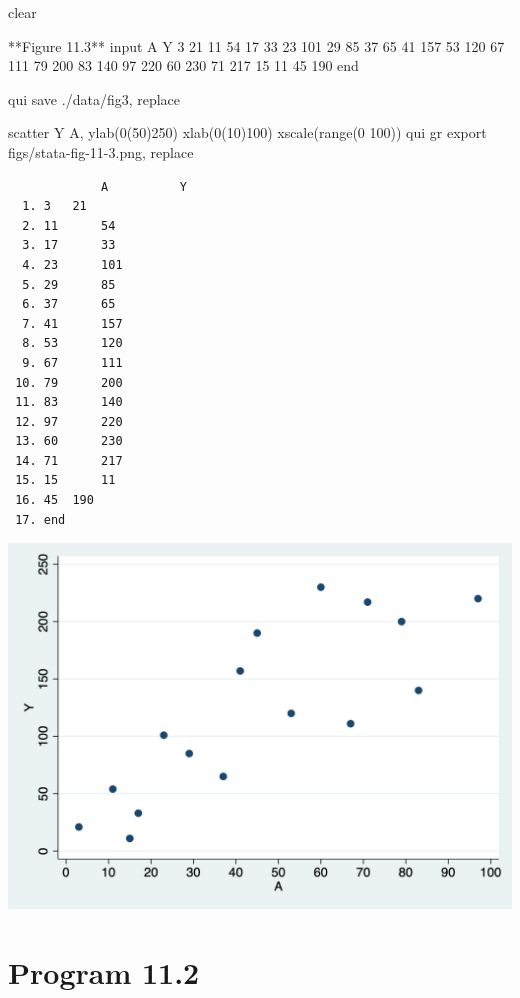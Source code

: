 \documentclass[
  10pt,
  a4paper,
]{book}
\newenvironment{Shaded}{\begin{snugshade}}{\end{snugshade}}
\newcommand{\BaseNTok}[1]{\textcolor[rgb]{0.68,0.00,0.00}{#1}}
\newcommand{\KeywordTok}[1]{\textcolor[rgb]{0.00,0.46,0.62}{#1}}
\newcommand{\NormalTok}[1]{\textcolor[rgb]{0.00,0.46,0.62}{#1}}
\begin{document}
\begin{Shaded}
\begin{Highlighting}[]
\KeywordTok{clear}

\NormalTok{**Figure 11.3**}
\NormalTok{input A Y}
\NormalTok{3   21  }
\NormalTok{11  54}
\NormalTok{17  33}
\NormalTok{23  101}
\NormalTok{29  85}
\NormalTok{37  65}
\NormalTok{41  157}
\NormalTok{53  120}
\NormalTok{67  111}
\NormalTok{79  200}
\NormalTok{83  140}
\NormalTok{97  220}
\NormalTok{60  230}
\NormalTok{71  217}
\NormalTok{15  11}
\NormalTok{45  190}
\KeywordTok{end}

\KeywordTok{qui} \KeywordTok{save}\NormalTok{ ./}\KeywordTok{data}\NormalTok{/fig3, }\KeywordTok{replace}

\KeywordTok{scatter}\NormalTok{ Y A, ylab(0(50)250) xlab(0(10)100) }\BaseNTok{xscale}\NormalTok{(}\KeywordTok{range}\NormalTok{(0 100))}
\KeywordTok{qui} \KeywordTok{gr} \KeywordTok{export}\NormalTok{ figs/stata{-}fig{-}11{-}3.png, }\KeywordTok{replace}
\end{Highlighting}
\end{Shaded}

\begin{verbatim}
             A          Y
  1. 3   21  
  2. 11      54
  3. 17      33
  4. 23      101
  5. 29      85
  6. 37      65
  7. 41      157
  8. 53      120
  9. 67      111
 10. 79      200
 11. 83      140
 12. 97      220
 13. 60      230
 14. 71      217
 15. 15      11
 16. 45  190
 17. end
\end{verbatim}

\begin{center}\includegraphics[width=0.85\linewidth]{figs/stata-fig-11-3} \end{center}

\hypertarget{program-11.2-1}{%
\section{Program 11.2}\label{program-11.2-1}}
\end{document}
